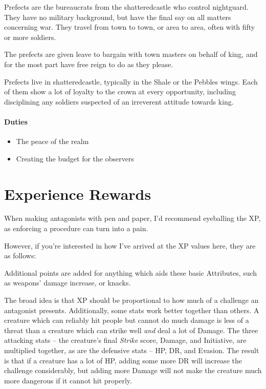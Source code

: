 \begin{multicols}{2}
Prefects are the bureaucrats from the \gls{shatteredcastle} who control \gls{nightguard}.
They have no military background, but have the final say on all matters concerning war.
They travel from town to town, or area to area, often with fifty or more soldiers.

The prefects are given leave to bargain with town masters on behalf of \gls{king}, and for the most part have free reign to do as they please.

Prefects live in \gls{shatteredcastle}, typically in the Shale or the Pebbles wings.
Each of them show a lot of loyalty to the crown at every opportunity, including disciplining any soldiers suspected of an irreverent attitude towards \gls{king}.

\subsubsection{Duties}

\begin{itemize}

	\item{The peace of the realm}
	\item{Creating the budget for the observers}

\end{itemize}

\end{multicols}

\chapter{Experience Rewards}

\begin{multicols}{2}

\noindent When making antagonists with pen and paper, I'd recommend eyeballing the XP, as enforcing a procedure can turn into a pain.

However, if you're interested in how I've arrived at the XP values here, they are as follows:

Additional points are added for anything which aids these basic Attributes, such as weapons' damage increase, or knacks.

The broad idea is that XP should be proportional to how much of a challenge an antagonist presents.
Additionally, some stats work better together than others.
A creature which can reliably hit people but cannot do much damage is less of a threat than a creature which can strike well \emph{and} deal a lot of Damage.
The three attacking stats -- the creature's final \textit{Strike} score, Damage, and Initiative, are multiplied together, as are the defensive stats -- HP, DR, and Evasion.
The result is that if a creature has a lot of HP, adding some more DR will increase the challenge considerably, but adding more Damage will not make the creature much more dangerous if it cannot hit properly.

\end{multicols}

